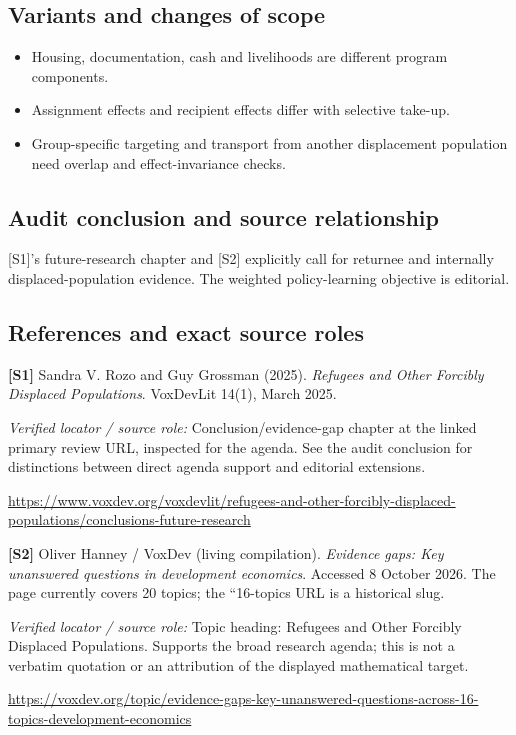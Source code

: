 \documentclass[11pt,a4paper]{article}
\begin{document}
\subsection*{Variants and changes of scope}

\begin{itemize}
\item Housing, documentation, cash and livelihoods are different program components.
\item Assignment effects and recipient effects differ with selective take-up.
\item Group-specific targeting and transport from another displacement population need overlap and effect-invariance checks.
\end{itemize}

\subsection*{Audit conclusion and source relationship}

[S1]'s future-research chapter and [S2] explicitly call for returnee and internally displaced-population evidence. The weighted policy-learning objective is editorial.

\subsection*{References and exact source roles}

{\footnotesize\raggedright
\par\noindent\textbf{[S1]} Sandra V. Rozo and Guy Grossman (2025). \emph{Refugees and Other Forcibly Displaced Populations}. VoxDevLit 14(1), March 2025.\par \textit{Verified locator / source role:} Conclusion/evidence-gap chapter at the linked primary review URL, inspected for the agenda. See the audit conclusion for distinctions between direct agenda support and editorial extensions.\par \url{https://www.voxdev.org/voxdevlit/refugees-and-other-forcibly-displaced-populations/conclusions-future-research}\par\smallskip
\par\noindent\textbf{[S2]} Oliver Hanney / VoxDev (living compilation). \emph{Evidence gaps: Key unanswered questions in development economics}. Accessed 8 October 2026. The page currently covers 20 topics; the ``16-topics URL is a historical slug.\par \textit{Verified locator / source role:} Topic heading: Refugees and Other Forcibly Displaced Populations. Supports the broad research agenda; this is not a verbatim quotation or an attribution of the displayed mathematical target.\par \url{https://voxdev.org/topic/evidence-gaps-key-unanswered-questions-across-16-topics-development-economics}\par\smallskip
}
\end{document}
